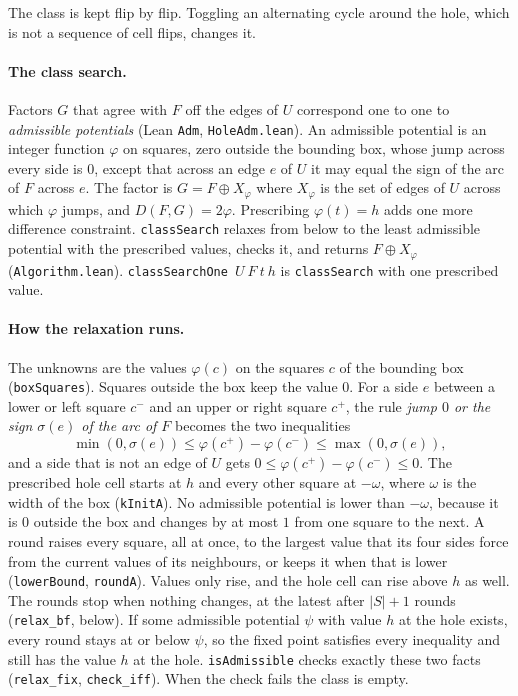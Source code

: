 \documentclass[11pt]{article}
\theoremstyle{plain}
\theoremstyle{definition}
\theoremstyle{remark}
\newcommand{\lean}[1]{\texttt{#1}}
\begin{document}
The class is kept flip by flip.
Toggling an alternating cycle around the hole, which is not a sequence of cell flips, changes it.

\paragraph{The class search.}
Factors $G$ that agree with $F$ off the edges of $U$ correspond one to one to \emph{admissible
potentials} (Lean \lean{Adm}, \lean{HoleAdm.lean}).
An admissible potential is an integer function $\varphi$ on squares, zero outside the bounding box,
whose jump across every side is $0$, except that across an edge $e$ of $U$ it may equal the sign of
the arc of $F$ across $e$.
The factor is $G=F\oplus X_\varphi$ where $X_\varphi$ is the set of edges of $U$ across which
$\varphi$ jumps, and $D(F,G)=2\varphi$.
Prescribing $\varphi(t)=h$ adds one more difference constraint.
\lean{classSearch} relaxes from below to the least admissible potential with the prescribed values, checks
it, and returns $F\oplus X_\varphi$ (\lean{Algorithm.lean}).
\lean{classSearchOne}~$U\ F\ t\ h$ is \lean{classSearch} with one prescribed value.

\paragraph{How the relaxation runs.}
The unknowns are the values $\varphi(c)$ on the squares $c$ of the bounding box (\lean{boxSquares}).
Squares outside the box keep the value $0$.
For a side $e$ between a lower or left square $c^-$ and an upper or right square $c^+$, the rule
\emph{jump $0$ or the sign $\sigma(e)$ of the arc of $F$} becomes the two inequalities
\[\min(0,\sigma(e))\le\varphi(c^+)-\varphi(c^-)\le\max(0,\sigma(e)),\]
and a side that is not an edge of $U$ gets $0\le\varphi(c^+)-\varphi(c^-)\le0$.
The prescribed hole cell starts at $h$ and every other square at $-\omega$, where $\omega$ is the width of the
box (\lean{kInitA}).
No admissible potential is lower than $-\omega$, because it is $0$ outside the box and changes by at most
$1$ from one square to the next.
A round raises every square, all at once, to the largest value that its four sides force from the
current values of its neighbours, or keeps it when that is lower (\lean{lowerBound},
\lean{roundA}).
Values only rise, and the hole cell can rise above $h$ as well.
The rounds stop when nothing changes, at the latest after $|S|+1$ rounds (\lean{relax\_bf}, below).
If some admissible potential $\psi$ with value $h$ at the hole exists, every round stays at or below
$\psi$, so the fixed point satisfies every inequality and still has the value $h$ at the hole.
\lean{isAdmissible} checks exactly these two facts (\lean{relax\_fix}, \lean{check\_iff}).
When the check fails the class is empty.
\end{document}
